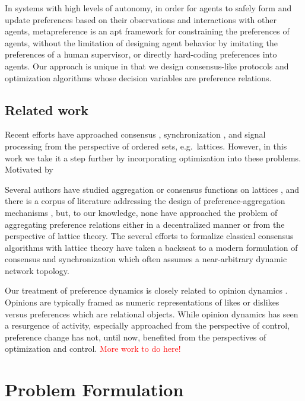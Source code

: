 \documentclass[conference]{ieeeconf}
\begin{document}
In systems with high levels of autonomy, in order for agents to safely form and update preferences based on their observations and interactions with other agents, metapreference is an apt framework for constraining the preferences of agents, without the limitation of designing agent behavior by imitating the preferences of a human supervisor, or directly hard-coding preferences into agents. Our approach is unique in that we design consensus-like protocols and optimization algorithms whose decision variables are preference relations.

\subsection{Related work}

Recent efforts have approached consensus \cite{riess2022}, synchronization \cite{maxplussync}, and signal processing \cite{puschel} from the perspective of ordered sets, e.g.~lattices. However, in this work we take it a step further by incorporating optimization into these problems. Motivated by 

Several authors have studied aggregation or consensus functions on lattices \cite{frenchdudes}, and there is a corpus of literature addressing the design of preference-aggregation mechanisms \cite{arrow2012}, but, to our knowledge, none have approached the problem of aggregating preference relations either in a decentralized manner or from the perspective of lattice theory. The several efforts to formalize classical consensus algorithms with lattice theory \cite{consensus} have taken a backseat to a modern formulation of consensus \cite{consensus} and synchronization \cite{conensus} which often assumes a near-arbitrary dynamic network topology.



Our treatment of preference dynamics is closely related to opinion dynamics \cite{opinion}. Opinions are typically framed as numeric representations of likes or dislikes versus preferences which are relational objects. While opinion dynamics has seen a resurgence of activity, especially approached from the perspective of control, preference change has not, until now, benefited from the perspectives of optimization and control.
\textcolor{red}{More work to do here!}


% 

\section{Problem Formulation}
\end{document}
